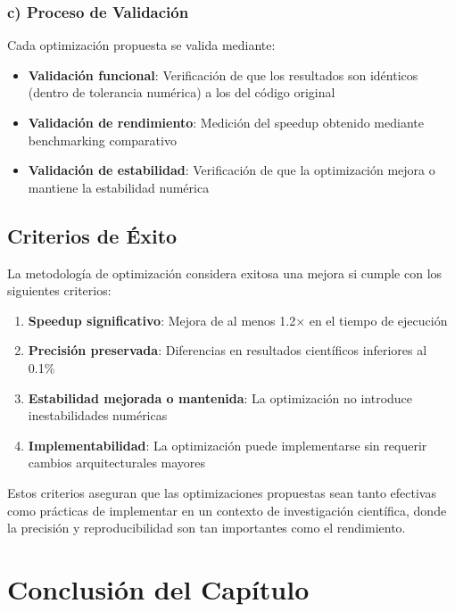 \subsubsection{c) Proceso de Validación}

Cada optimización propuesta se valida mediante:

\begin{itemize}
    \item \textbf{Validación funcional}: Verificación de que los resultados son idénticos (dentro de tolerancia numérica) a los del código original
    \item \textbf{Validación de rendimiento}: Medición del speedup obtenido mediante benchmarking comparativo
    \item \textbf{Validación de estabilidad}: Verificación de que la optimización mejora o mantiene la estabilidad numérica
\end{itemize}

\subsection{Criterios de Éxito}

La metodología de optimización considera exitosa una mejora si cumple con los siguientes criterios:

\begin{enumerate}
    \item \textbf{Speedup significativo}: Mejora de al menos 1.2× en el tiempo de ejecución
    \item \textbf{Precisión preservada}: Diferencias en resultados científicos inferiores al 0.1\%
    \item \textbf{Estabilidad mejorada o mantenida}: La optimización no introduce inestabilidades numéricas
    \item \textbf{Implementabilidad}: La optimización puede implementarse sin requerir cambios arquitecturales mayores
\end{enumerate}

Estos criterios aseguran que las optimizaciones propuestas sean tanto efectivas como prácticas de implementar en un contexto de investigación científica, donde la precisión y reproducibilidad son tan importantes como el rendimiento.

\section{Conclusión del Capítulo}

